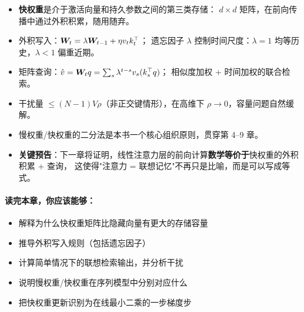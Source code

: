 \begin{itemize}
  \item \textbf{快权重}是介于激活向量和持久参数之间的第三类存储：
        $d \times d$ 矩阵，在前向传播中通过外积积累，随用随弃。

  \item 外积写入：$\boldsymbol{W}_t = \lambda \boldsymbol{W}_{t-1} + \eta v_t k_t^\top$；
        遗忘因子 $\lambda$ 控制时间尺度：$\lambda = 1$ 均等历史，$\lambda < 1$ 偏重近期。

  \item 矩阵查询：$\hat v = \boldsymbol{W}_t q = \sum_s \lambda^{t-s} v_s (k_s^\top q)$；
        相似度加权 + 时间加权的联合检索。

  \item 干扰量 $\le (N-1) V \rho$（非正交键情形），在高维下 $\rho \to 0$，容量问题自然缓解。

  \item 慢权重/快权重的二分法是本书一个核心组织原则，贯穿第 4--9 章。

  \item \textbf{关键预告}：下一章将证明，线性注意力层的前向计算\textbf{数学等价于}快权重的外积积累 + 查询，
        这使得"注意力 = 联想记忆"不再只是比喻，而是可以写成等式。
\end{itemize}

\paragraph{读完本章，你应该能够：}
\begin{itemize}
  \item 解释为什么快权重矩阵比隐藏向量有更大的存储容量
  \item 推导外积写入规则（包括遗忘因子）
  \item 计算简单情况下的联想检索输出，并分析干扰
  \item 说明慢权重/快权重在序列模型中分别对应什么
  \item 把快权重更新识别为在线最小二乘的一步梯度步
\end{itemize}
